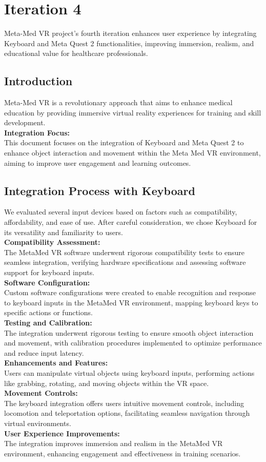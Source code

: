 \chapter{Iteration 4}
\label{ch:iter4}
Meta-Med VR project's fourth iteration enhances user experience by integrating Keyboard and Meta Quest 2 functionalities, improving immersion, realism, and educational value for healthcare professionals.
\section{Introduction}
Meta-Med VR is a revolutionary approach that aims to enhance medical education by providing immersive virtual reality experiences for training and skill development.\\
\textbf{Integration Focus:}\\
This document focuses on the integration of Keyboard and Meta Quest 2 to enhance object interaction and movement within the Meta Med VR environment, aiming to improve user engagement and learning outcomes.
\section{Integration Process with Keyboard}
We evaluated several input devices based on factors such as compatibility, affordability, and ease of use. After careful consideration, we chose Keyboard for its versatility and familiarity to users.\\
\textbf{Compatibility Assessment:}\\
The MetaMed VR software underwent rigorous compatibility tests to ensure seamless integration, verifying hardware specifications and assessing software support for keyboard inputs.\\
\textbf{Software Configuration:}\\
Custom software configurations were created to enable recognition and response to keyboard inputs in the MetaMed VR environment, mapping keyboard keys to specific actions or functions.\\
\textbf{Testing and Calibration:}\\
The integration underwent rigorous testing to ensure smooth object interaction and movement, with calibration procedures implemented to optimize performance and reduce input latency.\\
\textbf{Enhancements and Features:}\\ 
Users can manipulate virtual objects using keyboard inputs, performing actions like grabbing, rotating, and moving objects within the VR space.\\
\textbf{Movement Controls:}\\
The keyboard integration offers users intuitive movement controls, including locomotion and teleportation options, facilitating seamless navigation through virtual environments.\\
\textbf{User Experience Improvements:}\\
The integration improves immersion and realism in the MetaMed VR environment, enhancing engagement and effectiveness in training scenarios.
